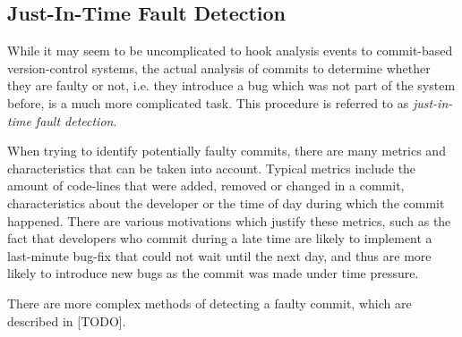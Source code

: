 \subsection{Just-In-Time Fault Detection}

While it may seem to be uncomplicated to hook analysis events to commit-based version-control systems, the actual analysis of commits to determine whether they are faulty or not, i.e. they introduce a bug which was not part of the system before, is a much more complicated task. This procedure is referred to as \textit{just-in-time fault detection}. \cite{Nayrolles2018, Kamei2013}

When trying to identify potentially faulty commits, there are many metrics and characteristics that can be taken into account. Typical metrics include the amount of code-lines that were added, removed or changed in a commit, characteristics about the developer or the time of day during which the commit happened. There are various motivations which justify these metrics, such as the fact that developers who commit during a late time are likely to implement a last-minute bug-fix that could not wait until the next day, and thus are more likely to introduce new bugs as the commit was made under time pressure. \cite{Goyal2017}

There are more complex methods of detecting a faulty commit, which are described in [TODO].

